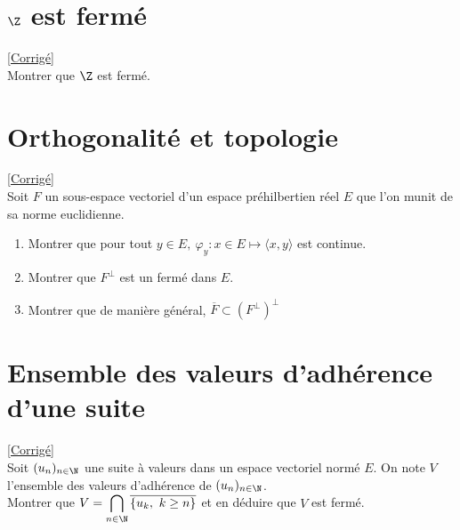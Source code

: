 \documentclass{book}
\begin{document}
\section{$\Z$ est fermé }
\label{Z est fermé}
\textcolor{blue}{\hyperref[sec:z-est-ferme-etoile1]{[Corrigé]}}\\
Montrer que $\Z$ est fermé.

\section{Orthogonalité et topologie }
\label{Orthogonalité et topologie}
\textcolor{blue}{\hyperref[sec:orthogonalite-et-topologie]{[Corrigé]}}\\
Soit $F$ un sous-espace vectoriel d'un espace préhilbertien réel $E$ que l'on munit de sa norme euclidienne.
\begin{enumerate}
	\item Montrer que pour tout $y\in E, \ \varphi_y:x\in E \mapsto \langle x,y\rangle$ est continue.
	\item Montrer que $F^{\bot}$ est un fermé dans $E$.
	\item Montrer que de manière général, $\overline{F}\subset(F^{\bot})^{\bot}$
\end{enumerate}

\section{Ensemble des valeurs d'adhérence d'une suite }
\label{Ensemble des valeurs d'adhérence d'une suite}
\textcolor{blue}{\hyperref[sec:ensemble-des-valeurs-dadherence-dune-suite]{[Corrigé]}}\\
Soit $(u_n)_{n\in \N}$ une suite à valeurs dans un espace vectoriel normé $E$. On note $V$ l'ensemble des valeurs d'adhérence de $(u_n)_{n\in \N}$.\\
Montrer que $V=\displaystyle\bigcap\limits_{n\in \N}{\overline{\{u_k,\ k\geq n\}}}$ et en déduire que $V$ est fermé.
\end{document}
